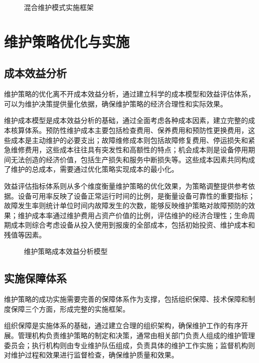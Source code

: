 \begin{figure}[h]
\centering
\caption{混合维护模式实施框架}
\label{fig:hybrid_maintenance_model}
\end{figure}

\section{维护策略优化与实施}

\subsection{成本效益分析}

维护策略的优化离不开成本效益分析，通过建立科学的成本模型和效益评估体系，可以为维护决策提供量化依据，确保维护策略的经济合理性和实际效果。

维护成本模型是成本效益分析的基础，通过全面考虑各种成本因素，建立完整的成本核算体系。预防性维护成本主要包括检查费用、保养费用和预防性更换费用，这些成本是主动维护的必要支出；故障维修成本则包括故障修复费用、停运损失和紧急维修费用，这些成本往往具有突发性和高额性的特点；机会成本则是设备停用期间无法创造的经济价值，包括生产损失和服务中断损失等。这些成本因素共同构成了维护的总成本，需要通过优化策略实现成本的最小化。

效益评估指标体系则从多个维度衡量维护策略的优化效果，为策略调整提供参考依据。设备可用率反映了设备正常运行时间的比例，是衡量设备可靠性的重要指标；故障发生率则统计单位时间内故障发生的次数，能够反映维护策略对故障预防的效果；维护成本率通过维护费用占资产价值的比例，评估维护的经济合理性；生命周期成本则综合考虑设备从投入使用到报废的全部成本，包括初始投资、维护成本和残值等因素。

\begin{figure}[h]
\centering
\caption{维护策略成本效益分析模型}
\label{fig:cost_benefit_analysis}
\end{figure}

\subsection{实施保障体系}

维护策略的成功实施需要完善的保障体系作为支撑，包括组织保障、技术保障和制度保障三个方面，形成完整的实施框架。

组织保障是实施体系的基础，通过建立合理的组织架构，确保维护工作的有序开展。管理机构负责维护策略的制定和决策，通常由相关部门负责人组成的维护管理委员会；执行机构则由专业维护队伍组成，负责具体的维护工作实施；监督机构则对维护过程和效果进行监督检查，确保维护质量和效果。

